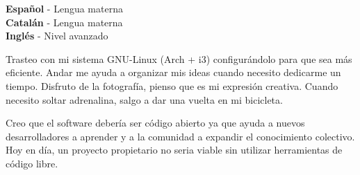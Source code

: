 \documentclass[9pt]{developercv} %
\begin{document}
\begin{minipage}[t]{0.3\textwidth}
	\vspace{-\baselineskip} %

	
	\textbf{Español} - Lengua materna\\
	\textbf{Catalán} - Lengua materna\\
	\textbf{Inglés} - Nivel avanzado
\end{minipage}
\hfill
\begin{minipage}[t]{0.3\textwidth}
	\vspace{-\baselineskip} %
	
	
  Trasteo con mi sistema GNU-Linux (Arch + i3) configurándolo para que sea más eficiente.
  Andar me ayuda a organizar mis ideas cuando necesito dedicarme un tiempo.
  Disfruto de la fotografía, pienso que es mi expresión creativa.
  Cuando necesito soltar adrenalina, salgo a dar una vuelta en mi bicicleta.
\end{minipage}
\hfill
\begin{minipage}[t]{0.3\textwidth}
	\vspace{-\baselineskip} %
	

	Creo que el software debería ser código abierto ya que ayuda a nuevos desarrolladores a aprender y a la comunidad a expandir el conocimiento colectivo. Hoy en día, un proyecto propietario no seria viable sin utilizar herramientas de código libre.
\end{minipage}

\end{document}
